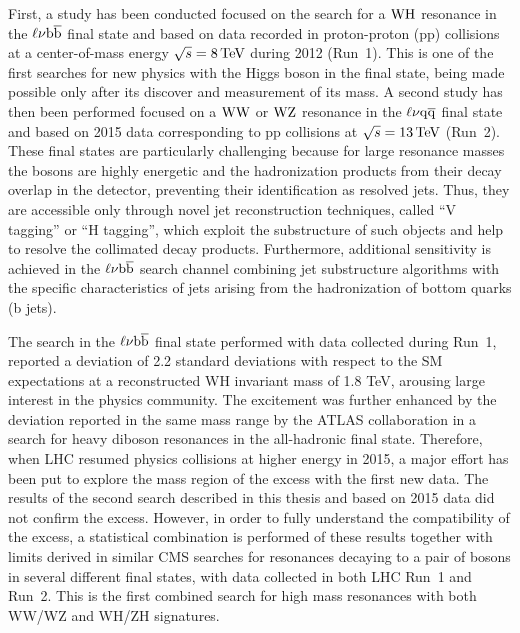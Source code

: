 First, a study has been conducted focused on the search for a $\mathrm{W}\mathrm{H}$ resonance in the $\ell\nu{\mathrm{b}\overline{\mathrm{b}}}$ final state and based on data recorded in proton-proton (pp) collisions at a center-of-mass energy $\sqrt{s} = 8\,\text{Te\hspace{-.08em}V}$ during 2012 (Run~1). This is one of the first searches for new physics with the Higgs boson in the final state, being made possible only after its discover and measurement of its mass.
A second study has then been performed focused on a $\mathrm{W}\mathrm{W}$ or $\mathrm{W}\mathrm{Z}$ resonance in the $\ell\nu\mathrm{q}\overline{\mathrm{q}}$ final state and based on 2015 data corresponding to pp collisions at $\sqrt{s} = 13\,\text{Te\hspace{-.08em}V}$ (Run~2).
These final states are particularly challenging because for large resonance masses the bosons are highly energetic and the hadronization products from their decay overlap in the detector, preventing their identification as resolved jets.
Thus, they are accessible only through novel jet reconstruction techniques, called ``V tagging'' or ``H tagging'', which exploit the substructure of such objects and help to resolve the collimated decay products.
Furthermore, additional sensitivity is achieved in the $\ell\nu{\mathrm{b}\overline{\mathrm{b}}}$ search channel combining jet substructure algorithms with the specific characteristics of jets arising from the hadronization of bottom quarks (b jets).

The search in the $\ell\nu{\mathrm{b}\overline{\mathrm{b}}}$ final state performed with data collected during Run~1, reported a deviation of 2.2 standard deviations with respect to the SM expectations at a reconstructed WH invariant mass of 1.8 TeV, arousing large interest in the physics community. The excitement was further enhanced by the deviation reported in the same mass range by the ATLAS collaboration in a search for heavy diboson resonances in the all-hadronic final state. 
Therefore, when LHC resumed physics collisions at higher energy in 2015, a major effort has been put to explore the mass region of the excess with the first new data. The results of the second search described in this thesis and based on 2015 data did not confirm the excess. However, in order to fully understand the compatibility of the excess, a statistical combination is performed of these results together with limits derived in similar CMS searches for resonances decaying to a pair of bosons in several different final states, with data collected in both LHC Run~1 and Run~2. This is the first combined search for high mass resonances with both WW/WZ and WH/ZH signatures.\\

